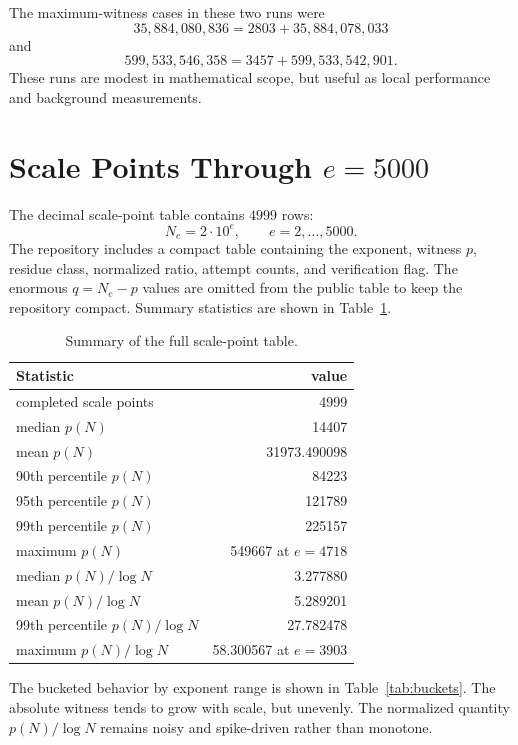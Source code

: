 \documentclass[11pt]{article}
\begin{document}
The maximum-witness cases in these two runs were
\[
  35{,}884{,}080{,}836 = 2803 + 35{,}884{,}078{,}033
\]
and
\[
  599{,}533{,}546{,}358 = 3457 + 599{,}533{,}542{,}901.
\]
These runs are modest in mathematical scope, but useful as local performance
and background measurements.

\section{\texorpdfstring{Scale Points Through \(e=5000\)}{Scale Points Through e=5000}}

The decimal scale-point table contains \(4999\) rows:
\[
  N_e=2\cdot10^e,\qquad e=2,\ldots,5000.
\]
The repository includes a compact table containing the exponent, witness
\(p\), residue class, normalized ratio, attempt counts, and verification flag.
The enormous \(q=N_e-p\) values are omitted from the public table to keep the
repository compact. Summary statistics are shown in Table~\ref{tab:summary}.

\begin{table}[!htbp]
\centering
\caption{Summary of the full scale-point table.}
\label{tab:summary}
\begin{tabular}{lr}
\toprule
Statistic & value \\
\midrule
completed scale points & 4999 \\
median \(p(N)\) & 14407 \\
mean \(p(N)\) & 31973.490098 \\
90th percentile \(p(N)\) & 84223 \\
95th percentile \(p(N)\) & 121789 \\
99th percentile \(p(N)\) & 225157 \\
maximum \(p(N)\) & 549667 at \(e=4718\) \\
median \(p(N)/\log N\) & 3.277880 \\
mean \(p(N)/\log N\) & 5.289201 \\
99th percentile \(p(N)/\log N\) & 27.782478 \\
maximum \(p(N)/\log N\) & 58.300567 at \(e=3903\) \\
\bottomrule
\end{tabular}
\end{table}

The bucketed behavior by exponent range is shown in Table~\ref{tab:buckets}.
The absolute witness tends to grow with scale, but unevenly. The normalized
quantity \(p(N)/\log N\) remains noisy and spike-driven rather than monotone.
\end{document}
